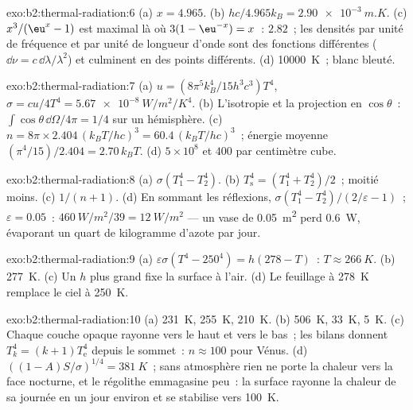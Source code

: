 \begin{solution}{exo:b2:thermal-radiation:6}
(a) $x = 4.965$. (b) $hc/4.965k_B = \qty{2.90e-3}{m.K}$. (c) $x^3/(\eu^x - 1)$
est maximal là où $3(1 - \eu^{-x}) = x$~: $2.82$~; les densités par unité de fréquence
et par unité de longueur d'onde sont des fonctions différentes ($\dd\nu = c\,\dd\lambda/\lambda^2$)
et culminent en des points différents. (d) \qty{10000}{K}~; blanc bleuté.
\end{solution}

\begin{solution}{exo:b2:thermal-radiation:7}
(a) $u = (8\pi^5k_B^4/15h^3c^3)T^4$, $\sigma = cu/4T^4 = \qty{5.67e-8}{W/m^2/K^4}$.
(b) L'isotropie et la projection en $\cos\theta$~: $\int\cos\theta\,\dd\Omega/4\pi = 1/4$
sur un hémisphère. (c) $n = 8\pi \times 2.404\,(k_BT/hc)^3 = 60.4\,(k_BT/hc)^3$~;
énergie moyenne $(\pi^4/15)/2.404 = 2.70\,k_BT$. (d) $5 \times 10^8$ et $400$
par centimètre cube.
\end{solution}

\begin{solution}{exo:b2:thermal-radiation:8}
(a) $\sigma(T_1^4 - T_2^4)$. (b) $T_{\text{s}}^4 = (T_1^4 + T_2^4)/2$~; moitié moins. (c)
$1/(n + 1)$. (d) En sommant les réflexions, $\sigma(T_1^4 - T_2^4)/(2/\varepsilon -
1)$~; $\varepsilon = 0.05$~: $\qty{460}{W/m^2}/39 = \qty{12}{W/m^2}$ --- un vase de
\qty{0.05}{m^2} perd \qty{0.6}{W}, évaporant un quart de kilogramme
d'azote par jour.
\end{solution}

\begin{solution}{exo:b2:thermal-radiation:9}
(a) $\varepsilon\sigma(T^4 - 250^4) = h(278 - T)$~: $T \approx \qty{266}{K}$. (b)
\qty{277}{K}. (c) Un $h$ plus grand fixe la surface à l'air. (d) Le feuillage
à \qty{278}{K} remplace le ciel à \qty{250}{K}.
\end{solution}

\begin{solution}{exo:b2:thermal-radiation:10}
(a) \qty{231}{K}, \qty{255}{K}, \qty{210}{K}. (b) \qty{506}{K}, \qty{33}{K}, \qty{5}{K}.
(c) Chaque couche opaque rayonne vers le haut et vers le bas~; les bilans donnent
$T_k^4 = (k + 1)T_{\text{e}}^4$ depuis le sommet~: $n \approx 100$ pour Vénus. (d)
$((1 - A)S/\sigma)^{1/4} = \qty{381}{K}$~; sans atmosphère rien ne porte la
chaleur vers la face nocturne, et le régolithe emmagasine peu~: la surface
rayonne la chaleur de sa journée en un jour environ et se stabilise vers
\qty{100}{K}.
\end{solution}

